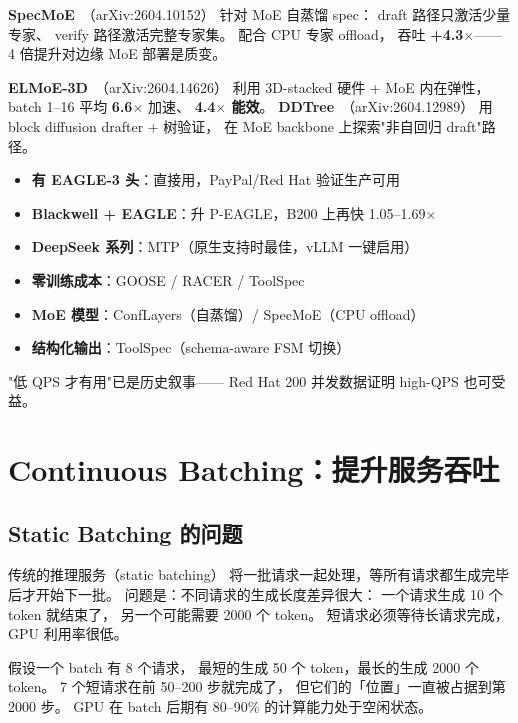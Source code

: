 \textbf{SpecMoE}~\cite{specmoe2026}（arXiv:2604.10152）
针对 MoE 自蒸馏 spec：
draft 路径只激活少量专家、
verify 路径激活完整专家集。
配合 CPU 专家 offload，
吞吐 \textbf{+4.3$\times$}——
4 倍提升对边缘 MoE 部署是质变。

\textbf{ELMoE-3D}~\cite{elmoe3d2026}（arXiv:2604.14626）
利用 3D-stacked 硬件 + MoE 内在弹性，
batch 1--16 平均 \textbf{6.6$\times$} 加速、
\textbf{4.4$\times$ 能效}。
\textbf{DDTree}~\cite{ddtree2026}（arXiv:2604.12989）
用 block diffusion drafter + 树验证，
在 MoE backbone 上探索"非自回归 draft"路径。

\begin{keybox}
\begin{itemize}[noitemsep]
  \item \textbf{有 EAGLE-3 头}：直接用，PayPal/Red Hat 验证生产可用
  \item \textbf{Blackwell + EAGLE}：升 P-EAGLE，B200 上再快 1.05--1.69$\times$
  \item \textbf{DeepSeek 系列}：MTP（原生支持时最佳，vLLM 一键启用）
  \item \textbf{零训练成本}：GOOSE / RACER / ToolSpec
  \item \textbf{MoE 模型}：ConfLayers（自蒸馏）/ SpecMoE（CPU offload）
  \item \textbf{结构化输出}：ToolSpec（schema-aware FSM 切换）
\end{itemize}
"低 QPS 才有用"已是历史叙事——
Red Hat 200 并发数据证明 high-QPS 也可受益。
\end{keybox}


\section{Continuous Batching：提升服务吞吐}

\subsection{Static Batching 的问题}

传统的推理服务（static batching）
将一批请求一起处理，等所有请求都生成完毕后才开始下一批。
问题是：不同请求的生成长度差异很大：
一个请求生成 10 个 token 就结束了，
另一个可能需要 2000 个 token。
短请求必须等待长请求完成，GPU 利用率很低。

假设一个 batch 有 8 个请求，
最短的生成 50 个 token，最长的生成 2000 个 token。
7 个短请求在前 50--200 步就完成了，
但它们的「位置」一直被占据到第 2000 步。
GPU 在 batch 后期有 80--90\% 的计算能力处于空闲状态。

